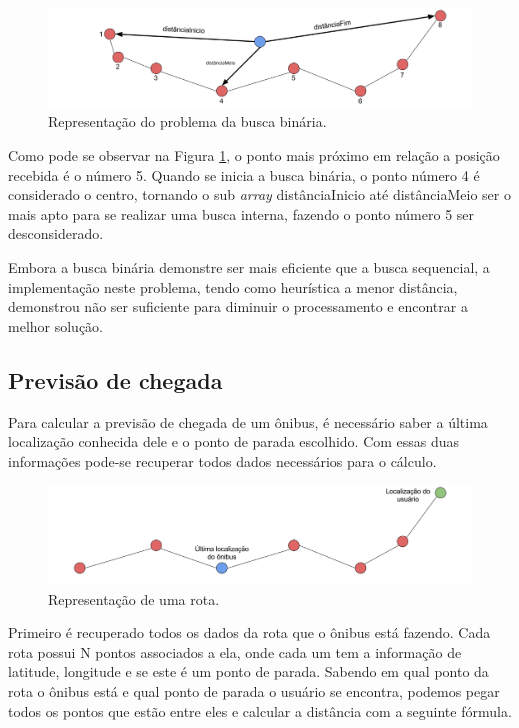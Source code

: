 \documentclass[
	12pt,				%
	oneside,			%
	a4paper,			%
	brazil				%
]{abntex2}
\begin{document}
\begin{figure}[H]
\centering
\includegraphics[width=12cm, center]{images/busca-binaria-problema}
\caption{Representação do problema da busca binária.}
\label{binary-search-problem}
\end{figure}

Como pode se observar na Figura \ref{binary-search-problem}, o ponto mais próximo em relação a posição recebida é o número 5. Quando se inicia a busca binária, o ponto número 4 é considerado o centro, tornando o sub \textit{array} distânciaInicio até distânciaMeio ser o mais apto para se realizar uma busca interna, fazendo o ponto número 5 ser desconsiderado.

Embora a busca binária demonstre ser mais eficiente que a busca sequencial, a implementação neste problema, tendo como heurística a menor distância, demonstrou não ser suficiente para diminuir o processamento e encontrar a melhor solução.

\subsection{Previsão de chegada}

Para calcular a previsão de chegada de um ônibus, é necessário saber a última localização conhecida dele e o ponto de parada escolhido. Com essas duas informações pode-se recuperar todos dados necessários para o cálculo.

\begin{figure}[H]
\centering
\includegraphics[width=15cm, center]{images/previsao-rota}
\caption{Representação de uma rota.}
\label{Rotulo}
\end{figure}

Primeiro é recuperado todos os dados da rota que o ônibus está fazendo. Cada rota possui N pontos associados a ela, onde cada um tem a informação de latitude, longitude e se este é um ponto de parada. Sabendo em qual ponto da rota o ônibus está e qual ponto de parada o usuário se encontra, podemos pegar todos os pontos que estão entre eles e calcular a distância com a seguinte fórmula.
\end{document}
